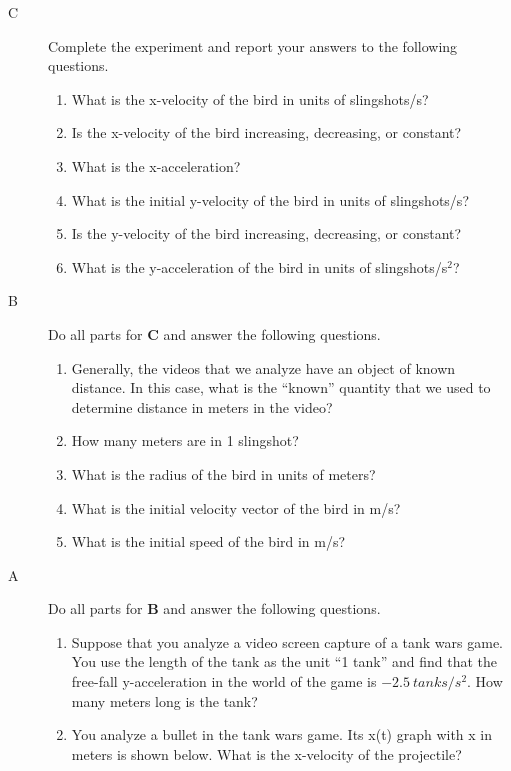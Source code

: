 \begin{description}

\item[C]  Complete the experiment and report your answers to the following questions.

\begin{enumerate}
	 \item What is the x-velocity of the bird in units of slingshots/s?
	 \item Is the x-velocity of the bird increasing, decreasing, or constant?
	 \item What is the x-acceleration?
	 \item What is the initial y-velocity of the bird in units of slingshots/s?
	 \item Is the y-velocity of the bird increasing, decreasing, or constant?
	 \item What is the y-acceleration of the bird in units of slingshots/s$^2$?
\end{enumerate}

\item[B] Do all parts for {\bf C} and answer the following questions.

\begin{enumerate}
	\item Generally, the videos that we analyze have an object of known distance. In this case, what is the ``known'' quantity that we used to determine distance in meters in the video?
	\item How many meters are in 1 slingshot?
	\item What is the radius of the bird in units of meters?
	\item What is the initial velocity vector of the bird in m/s?
	\item What is the initial speed of the bird in m/s?
\end{enumerate}

\item[A] Do all parts for {\bf B} and answer the following questions.

\begin{enumerate}
	\item Suppose that you analyze a video screen capture of a tank wars game. You use the length of the tank as the unit ``1 tank'' and find that the free-fall y-acceleration in the world of the game is $-2.5\ tanks/s^2$. How many meters long is the tank?
	\item You analyze a bullet in the tank wars game. Its x(t) graph with x in meters is shown below. What is the x-velocity of the projectile?
	

\end{enumerate}
\end{description}
